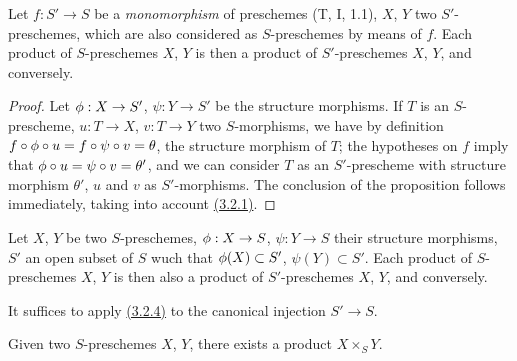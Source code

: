 \begin{prop}[3.2.4]
\label{prop-1.3.2.4}
Let $f:S'\to S$ be a {\em monomorphism} of preschemes {\rm (T, I, 1.1)}, $X$, $Y$ two
$S'$-preschemes, which are also considered as $S$-preschemes by means of $f$. Each product of
$S$-preschemes $X$, $Y$ is then a product of $S'$-preschemes $X$, $Y$, and conversely.
\end{prop}

\begin{proof}
\label{proof-prop-1.3.2.4}
Let $\phi:X\to S'$, $\psi:Y\to S'$ be the structure morphisms. If $T$ is an $S$-prescheme,
$u:T\to X$, $v:T\to Y$ two $S$-morphisms, we have by definition
$f\circ\phi\circ u=f\circ\psi\circ v=\theta$, the structure morphism of $T$; the hypotheses
on $f$ imply that $\phi\circ u=\psi\circ v=\theta'$, and we can consider $T$ as an
$S'$-prescheme with structure morphism $\theta'$, $u$ and $v$ as $S'$-morphisms. The
conclusion of the proposition follows immediately, taking into account \hyperref[defn-1.3.2.1]{(3.2.1)}.
\end{proof}

\begin{cor}[3.2.5]
\label{cor-1.3.2.5}
Let $X$, $Y$ be two $S$-preschemes, $\phi:X\to S$, $\psi:Y\to S$ their structure morphisms,
$S'$ an open subset of $S$ wuch that $\phi(X)\subset S'$, $\psi(Y)\subset S'$. Each product
of $S$-preschemes $X$, $Y$ is then also a product of $S'$-preschemes $X$, $Y$, and
conversely.
\end{cor}

It suffices to apply \hyperref[prop-1.3.2.4]{(3.2.4)} to the canonical injection $S'\to S$.

\begin{thm}[3.2.6]
\label{thm-1.3.2.6}
Given two $S$-preschemes $X$, $Y$, there exists a product $X\times_S Y$.
\end{thm}


